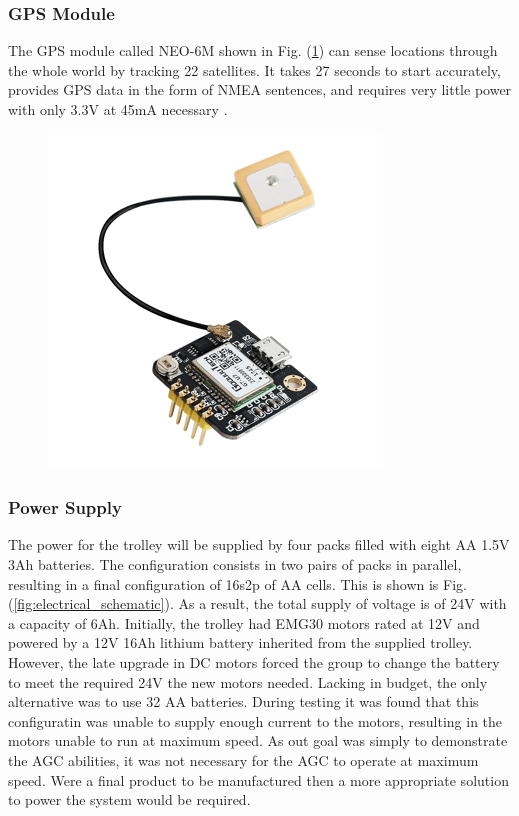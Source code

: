 \documentclass[11pt,landscape]{article}
\begin{document}
\begin{multicols}{3}
\subsubsection{GPS Module}
The GPS module called NEO-6M shown in Fig. (\ref{fig:gps_module}) can sense
locations through the whole world by tracking 22 satellites. It takes 27 seconds
to start accurately, provides GPS data in the form of NMEA sentences, and
requires very little power with only 3.3V at 45mA necessary \cite{neo_gps}.

\begin{figure}[H]
    \begin{center}
        \includegraphics[]{gps_module.png}
        \label{fig:gps_module}
    \end{center}
\end{figure}


\subsubsection{Power Supply}
The power for the trolley will be supplied by four packs filled with eight AA
1.5V 3Ah batteries. The configuration consists in two pairs of packs in
parallel, resulting in a final configuration of 16s2p of AA cells. This is shown
is Fig. (\ref{fig:electrical_schematic}). As a result, the total supply of
voltage is of 24V with a capacity of 6Ah. Initially, the trolley had EMG30
motors rated at 12V and powered by a 12V 16Ah lithium battery inherited from the
supplied trolley. However, the late upgrade in DC motors forced the group to
change the battery to meet the required 24V the new motors needed. Lacking in
budget, the only alternative was to use 32 AA batteries. During testing it was found
that this configuratin was unable to supply enough current to the motors,
resulting in the motors unable to run at maximum speed. As out goal was simply
to demonstrate the AGC abilities, it was not necessary for the AGC to operate at
maximum speed. Were a final product to be manufactured then a more
appropriate solution to power the system would be required.


\end{multicols}
\end{document}
